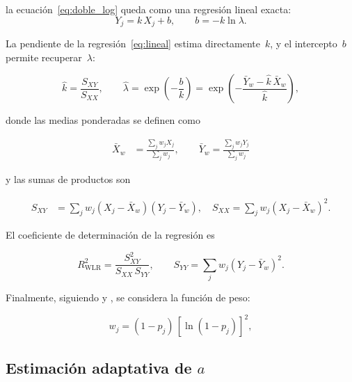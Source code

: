 \documentclass[APA,STIX1COL]{WileyNJD-v2}
\begin{document}
{\medskip
la ecuaci\'on~\eqref{eq:doble_log} queda como una regresi\'on lineal exacta:
\begin{equation}\label{eq:lineal}
Y_j = k\,X_j + b,\qquad b = -k\ln\lambda.
\end{equation}

\medskip

La pendiente de la regresi\'on~\eqref{eq:lineal} estima directamente~$k$,
y el intercepto~$b$ permite recuperar~$\lambda$:

\begin{equation}\label{eq:parametros}
\hat{k} = \frac{S_{XY}}{S_{XX}},\qquad
\hat{\lambda} = \exp\!\left(-\frac{b}{k}\right)
              = \exp\!\left(-\frac{\bar{Y}_w - \hat{k}\,\bar{X}_w}
                                   {\hat{k}}\right),
\end{equation}

\medskip

donde las medias ponderadas se definen como

\begin{align}
\bar{X}_w &= \frac{\sum_j w_j X_j}{\sum_j w_j},\qquad
\bar{Y}_w  = \frac{\sum_j w_j Y_j}{\sum_j w_j}
\end{align}

\medskip

y las sumas de productos son

\begin{align}
S_{XY} &= \sum_j w_j(X_j - \bar{X}_w)(Y_j - \bar{Y}_w),\quad
S_{XX}  = \sum_j w_j(X_j - \bar{X}_w)^2.\label{eq:sumas_w}
\end{align}

\medskip
El coeficiente de determinaci\'on de la regresi\'on es

\begin{equation}\label{eq:R2_wlr}
R^2_{\mathrm{WLR}} = \frac{S_{XY}^2}{S_{XX}\,S_{YY}},\qquad
S_{YY} = \sum_j w_j(Y_j - \bar{Y}_w)^2.
\end{equation}

\medskip

Finalmente, siguiendo \citet{olivera2019} y \citet{bergman1986}, se considera la
función de peso:

\begin{equation}\label{eq:peso_A}
w_j = (1 - p_j)\,[\ln(1-p_j)]^2,
\end{equation}

\subsection{Estimación adaptativa de \textbf{$a$}}\label{subsec:familia}

}
\end{document}
